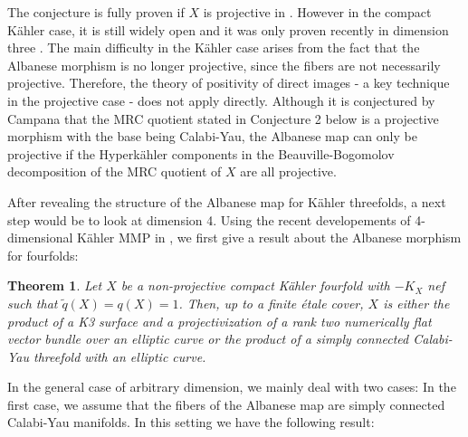 \documentclass[a4, 12pt]{amsart}
\numberwithin{equation}{section}
\newtheorem{bigthm}{Theorem}
\theoremstyle{definition}
\begin{document}
The conjecture is fully proven if $X$ is projective in \cite{Cao19}.
However in the compact K\"ahler case, it is still widely open and it was only proven recently in dimension three \cite{MW23}. 
The main difficulty in the K\"ahler case arises from the fact that the Albanese morphism is no longer projective, since the fibers are not necessarily projective. Therefore, the theory of positivity of direct images - a key technique in the projective case - does not apply directly. Although it is conjectured by Campana that the MRC quotient stated in Conjecture 2 below is a projective morphism with the base being Calabi-Yau, the Albanese map can only be projective if the Hyperk\"ahler components in the Beauville-Bogomolov decomposition of the MRC quotient of $X$ are all projective.

After revealing the structure of the Albanese map for K\"ahler threefolds, a next step would be to look at dimension 4. 
Using the recent developements of 4-dimensional K\"ahler MMP in \cite{DHP23}, we first give a result about the Albanese morphism for fourfolds:

\begin{bigthm}
Let $X$ be a non-projective compact K\"ahler fourfold with $-K_X$ nef such that $\tilde{q}(X)=q(X)=1$. 
Then, up to a finite \'etale cover, $X$ is either the product of a K3 surface and a projectivization of a rank two numerically flat vector bundle over an elliptic curve or the product of a simply connected Calabi-Yau threefold with an elliptic curve.
\end{bigthm}


In the general case of arbitrary dimension, we mainly deal with two cases: In the first case, we assume that the fibers of the Albanese map are simply connected Calabi-Yau manifolds.  In this setting we have the following result:
\end{document}

